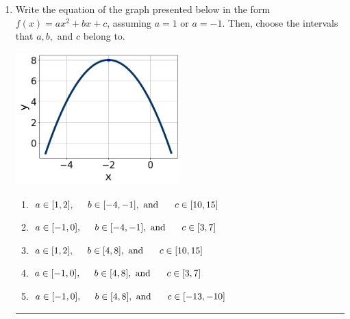 \documentclass[14pt]{extbook}
\newcommand{\litem}[1]{\item#1\hspace*{-1cm}\rule{\textwidth}{0.4pt}}
\begin{document}
\begin{enumerate}
{\begin{enumerate}[label=\Alph*.]
\end{enumerate} }
\litem{
Write the equation of the graph presented below in the form $f(x)=ax^2+bx+c$, assuming  $a=1$ or $a=-1$. Then, choose the intervals that $a, b,$ and $c$ belong to.
\begin{center}
    \includegraphics[width=0.5\textwidth]{../Figures/quadraticGraphToEquationCopyA.png}
\end{center}
\begin{enumerate}[label=\Alph*.]
\item \( a \in [1, 2], \hspace*{5mm} b \in [-4, -1], \text{ and } \hspace*{5mm} c \in [10, 15] \)
\item \( a \in [-1, 0], \hspace*{5mm} b \in [-4, -1], \text{ and } \hspace*{5mm} c \in [3, 7] \)
\item \( a \in [1, 2], \hspace*{5mm} b \in [4, 8], \text{ and } \hspace*{5mm} c \in [10, 15] \)
\item \( a \in [-1, 0], \hspace*{5mm} b \in [4, 8], \text{ and } \hspace*{5mm} c \in [3, 7] \)
\item \( a \in [-1, 0], \hspace*{5mm} b \in [4, 8], \text{ and } \hspace*{5mm} c \in [-13, -10] \)

\end{enumerate} }
\end{enumerate}
\end{document}
